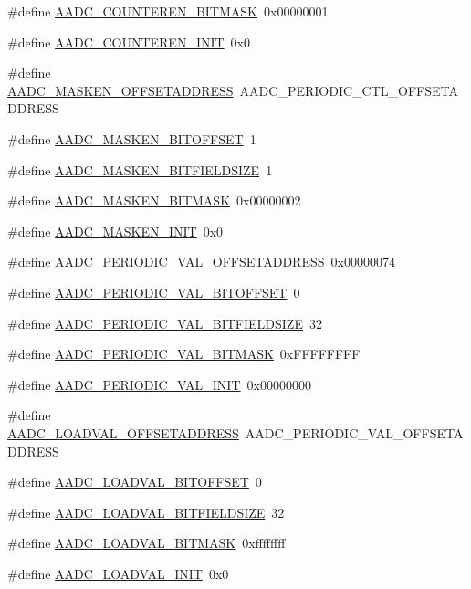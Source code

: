 \begin{DoxyCompactItemize}
\#define \hyperlink{a00543_aba36dbae7aa279c953c5eac60cefb035}{AADC\_\-COUNTEREN\_\-BITMASK}~0x00000001
\item 
\#define \hyperlink{a00543_ade2e7d1d44a1be66e0409d75420062b3}{AADC\_\-COUNTEREN\_\-INIT}~0x0
\item 
\#define \hyperlink{a00543_ae6c302be4c388501965422a055cd6e38}{AADC\_\-MASKEN\_\-OFFSETADDRESS}~AADC\_\-PERIODIC\_\-CTL\_\-OFFSETADDRESS
\item 
\#define \hyperlink{a00543_a8747161908c80bc0a984007465d373dd}{AADC\_\-MASKEN\_\-BITOFFSET}~1
\item 
\#define \hyperlink{a00543_a6a7072a1d2919bf057371e05ec3b37b5}{AADC\_\-MASKEN\_\-BITFIELDSIZE}~1
\item 
\#define \hyperlink{a00543_a345daa53035787407322e73792b30562}{AADC\_\-MASKEN\_\-BITMASK}~0x00000002
\item 
\#define \hyperlink{a00543_aa0647529993819bee9aaf0dc03d88bbe}{AADC\_\-MASKEN\_\-INIT}~0x0
\item 
\#define \hyperlink{a00543_a4db0f4de1cc76f186ecd8afa850a8612}{AADC\_\-PERIODIC\_\-VAL\_\-OFFSETADDRESS}~0x00000074
\item 
\#define \hyperlink{a00543_a6f2365cd2e07540e1b9a8095582c4faf}{AADC\_\-PERIODIC\_\-VAL\_\-BITOFFSET}~0
\item 
\#define \hyperlink{a00543_a84d89fb74c759585e8ca47416e715ae5}{AADC\_\-PERIODIC\_\-VAL\_\-BITFIELDSIZE}~32
\item 
\#define \hyperlink{a00543_a21f9d5ddd52cab3aafa49eb21490377b}{AADC\_\-PERIODIC\_\-VAL\_\-BITMASK}~0xFFFFFFFF
\item 
\#define \hyperlink{a00543_a70fb02261feae449f28452e59ef9accf}{AADC\_\-PERIODIC\_\-VAL\_\-INIT}~0x00000000
\item 
\#define \hyperlink{a00543_a077a25cb64b9e9d3599a4917f6c08f43}{AADC\_\-LOADVAL\_\-OFFSETADDRESS}~AADC\_\-PERIODIC\_\-VAL\_\-OFFSETADDRESS
\item 
\#define \hyperlink{a00543_afbca70841aa7da2fce3c1b3b613a2fd6}{AADC\_\-LOADVAL\_\-BITOFFSET}~0
\item 
\#define \hyperlink{a00543_a5081bd03786964121c7734bd7abce77c}{AADC\_\-LOADVAL\_\-BITFIELDSIZE}~32
\item 
\#define \hyperlink{a00543_a66a33f4df5bfa31f1e1d1631ca8ada54}{AADC\_\-LOADVAL\_\-BITMASK}~0xffffffff
\item 
\#define \hyperlink{a00543_add5ea00fcf56ab200059f40ddab4d021}{AADC\_\-LOADVAL\_\-INIT}~0x0
\end{DoxyCompactItemize}


